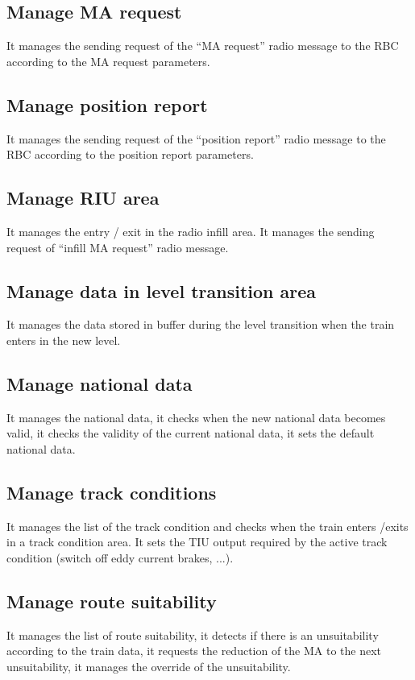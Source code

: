\documentclass[nocc]{template/openetcs_report}
\begin{document}
\subsection{Manage MA request}
It manages the sending request of the "`MA request"' radio message to the RBC according to the MA request parameters.

\subsection{Manage position report}
It manages the sending request of the "`position report"' radio message to the RBC according to the position report parameters.

\subsection{Manage RIU area}
It manages the entry / exit in the radio infill area. It manages the sending request of "`infill MA request"' radio message.

\subsection{Manage data in level transition area}
It manages the data stored in buffer during the level transition when the train enters in the new level.

\subsection{Manage national data}
It manages the national data, it checks when the new national data becomes valid, it checks the validity of the current national data, it sets the default national data.

\subsection{Manage track conditions}
It manages the list of the track condition and checks when the train enters /exits in a track condition area. It sets the TIU output required by the active track condition (switch off eddy current brakes, ...).

\subsection{Manage route suitability}
It manages the list of route suitability, it detects if there is an unsuitability according to the train data, it requests the reduction of the MA to the next unsuitability, it manages the override of the unsuitability.
\end{document}
